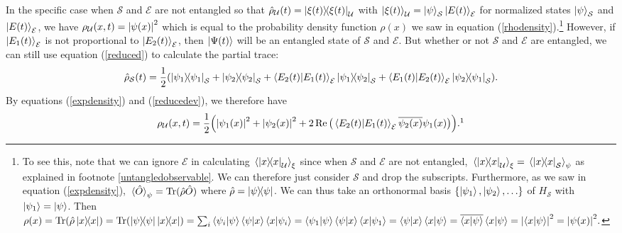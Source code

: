      In the specific case when $\mathcal{S}$ and $\mathcal{E}$ are not entangled so that $\hat{\rho}_\mathcal{U}(t)=\dyad{\xi(t)}_\mathcal{U}$ with $\ket{\xi(t)}_\mathcal{U}=\ket{\psi}_\mathcal{S}\ket{E(t)}_\mathcal{E}$ for normalized states $\ket{\psi}_\mathcal{S}$ and $\ket{E(t)}_\mathcal{E}$, we have $\rho_\mathcal{U}(x, t) =\abs{\psi(x)}^2$ which is equal to the probability density function $\rho(x)$ we saw in equation (\ref{rhodensity}).\footnote{To see this, note that we can ignore $\mathcal{E}$ in calculating $\ev*{\dyad{x}_\mathcal{U}}_\xi$ since when $\mathcal{S}$ and $\mathcal{E}$ are not entangled, $\ev*{\dyad{x}_\mathcal{U}}_\xi = \ev*{\dyad{x}_\mathcal{S}}_\psi$ as explained in footnote \ref{untangledobservable}. We can therefore just consider $\mathcal{S}$ and drop the subscripts.
    Furthermore, as we saw in equation (\ref{expdensity}), $\ev*{\hat{O}}_\psi=\Tr(\hat{\rho}\hat{O})$ where $\hat{\rho}=\dyad{\psi}$. 
    We can thus take an orthonormal basis $\{\ket{\psi_1},\ket{\psi_2},\ldots\}$ of $H_\mathcal{S}$ with $\ket{\psi_1}=\ket{\psi}$. 
    Then $\rho(x)=\Tr(\hat{\rho}\dyad{x})=\Tr(\dyad{\psi}\dyad{x})=\sum_i\ip{\psi_i}{\psi}\ip{\psi}{x}\ip{x}{\psi_i}=\ip{\psi_1}{\psi}\ip{\psi}{x}\ip{x}{\psi_1} =\ip{\psi}{x}\ip{x}{\psi}=\overline{\ip{x}{\psi}}\ip{x}{\psi}=\abs{\ip{x}{\psi}}^2=\abs{\psi(x)}^2.$} 
    However, if $\ket{E_1(t)}_\mathcal{E}$ is not proportional to $\ket{E_2(t)}_\mathcal{E}$, then $\ket{\Psi(t)}$ will be an entangled state of $\mathcal{S}$ and $\mathcal{E}$. But whether or not $\mathcal{S}$ and $\mathcal{E}$ are entangled, we can still use equation (\ref{reduced}) to calculate the partial trace:
    $$\hat{\rho}_\mathcal{S}(t)=\frac{1}{2}(\dyad{\psi_1}_\mathcal{S}+\dyad{\psi_2}_\mathcal{S}+\ip{E_2(t)}{E_1(t)}_\mathcal{E} \dyad{\psi_1}{\psi_2}_\mathcal{S}+\ip{E_1(t)}{E_2(t)}_\mathcal{E} \dyad{\psi_2}{\psi_1}_\mathcal{S}).$$
    By equations (\ref{expdensity}) and (\ref{reducedev}), we therefore have
    \begin{equation}\rho_\mathcal{U}(x, t)=\frac{1}{2}\Big(\abs{\psi_1(x)}^2+\abs{\psi_2(x)}^2+2\Re\big(\ip{E_2(t)}{E_1(t)}_\mathcal{E}\overline{\psi_2(x)}\psi_1(x)\big)\Big).\protect\footnotemark
    \end{equation}

